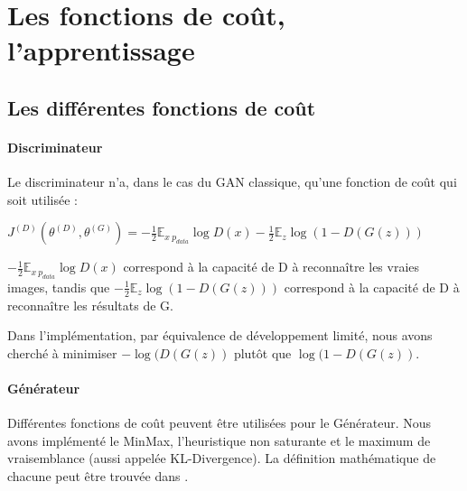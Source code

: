 \section{Les fonctions de coût, l'apprentissage}

\subsection{Les différentes fonctions de coût}
\paragraph{Discriminateur}
Le discriminateur n'a, dans le cas du GAN classique, qu'une fonction de coût qui soit utilisée : \\
\begin{center}
$J^{(D)}(\theta^{(D)}, \theta^{(G)}) = -\frac{1}{2}\mathbb{E}_{x~p_{data}}\log{D(x)}-\frac{1}{2}\mathbb{E}_{z}\log{(1-D(G(z)))}$
\end{center}
\vspace{8pt}
$-\frac{1}{2}\mathbb{E}_{x~p_{data}}\log{D(x)}$ correspond à la capacité de D à reconnaître les vraies images, tandis que $-\frac{1}{2}\mathbb{E}_{z}\log{(1-D(G(z)))}$ correspond à la capacité de D à reconnaître les résultats de G.

\begin{remark}
Dans l'implémentation, par équivalence de développement limité, nous avons cherché à minimiser $-\log{(D(G(z))}$ plutôt que $\log(1-D(G(z))$.
\end{remark}
\paragraph{Générateur}
Différentes fonctions de coût peuvent être utilisées pour le Générateur. Nous avons implémenté le MinMax, l'heuristique non saturante et le maximum de vraisemblance (aussi appelée KL-Divergence). La définition mathématique de chacune peut être trouvée dans \cite{goodfellow_nips_2016}.

